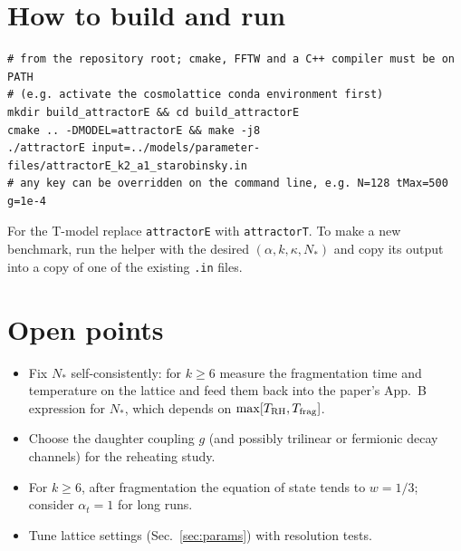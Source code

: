 \documentclass[11pt,a4paper]{article}
\newcommand{\aatt}{\alpha}
\newcommand{\at}{\alpha_t}
\newcommand{\file}[1]{\texttt{#1}}
\begin{document}
\section{How to build and run}
\begin{lstlisting}
# from the repository root; cmake, FFTW and a C++ compiler must be on PATH
# (e.g. activate the cosmolattice conda environment first)
mkdir build_attractorE && cd build_attractorE
cmake .. -DMODEL=attractorE && make -j8
./attractorE input=../models/parameter-files/attractorE_k2_a1_starobinsky.in
# any key can be overridden on the command line, e.g. N=128 tMax=500 g=1e-4
\end{lstlisting}
For the T-model replace \texttt{attractorE} with \texttt{attractorT}. To make a new benchmark, run the helper with the desired $(\aatt,k,\kappa,N_*)$ and copy its output into a copy of one of the existing \file{.in} files.

\section{Open points}
\begin{itemize}
\item Fix $N_*$ self-consistently: for $k\ge6$ measure the fragmentation time and temperature on the lattice and feed them back into the paper's App.~B expression for $N_*$, which depends on $\max[T_{\rm RH},T_{\rm frag}]$.
\item Choose the daughter coupling $g$ (and possibly trilinear or fermionic decay channels) for the reheating study.
\item For $k\ge6$, after fragmentation the equation of state tends to $w=1/3$; consider $\at=1$ for long runs.
\item Tune lattice settings (Sec.~\ref{sec:params}) with resolution tests.
\end{itemize}
\end{document}
